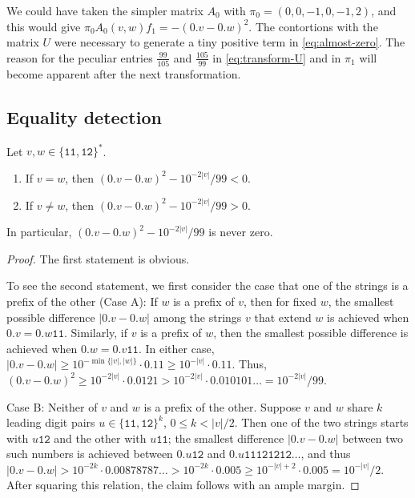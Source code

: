 \documentclass[a4paper,cleveref, autoref, thm-restate]{lipics-v2021}
\begin{document}
We could have taken the simpler matrix $A_0$ 
with $\pi_0=(0,0,-1,0,-1,2)$, and this would give
$\pi_0 A_0(v,w) f_1 = - (0.v-0.w)^2$. The contortions with the matrix
$U$
were necessary to generate a tiny positive term in \eqref{eq:almost-zero}.
The reason for the peculiar entries $\frac{99}{105}$ and $\frac{105}{99}$
in \eqref{eq:transform-U} and in $\pi_1$
will become
apparent after the next transformation.

\subsection{Equality detection}
\label{sec:equality}



\begin{lemma} \label{lemma:modif-threshold}
  Let $v,w \in \{\mathtt{11},\mathtt{12}\}^*$.
  \begin{enumerate}
  \item       If $v=w$,
    then
    $(0.v-0.w)^2-10^{-2|v|}/99 < 0$.
  \item       If $v\ne w$,
    then
    $(0.v-0.w)^2-10^{-2|v|}/99 > 0$.
  \end{enumerate}
 In particular, $(0.v-0.w)^2-10^{-2|v|}/99$ is never zero.
\end{lemma}
\begin{proof}
  The first statement is obvious.

To see the second statement,
we first consider the case that one of the strings
is a  prefix of
the other %
(Case A):
If $w$ is a prefix of $v$, then for
fixed $w$,
  the smallest possible difference
$|0.v-0.w|$ among the strings $v$ that extend $w$
is achieved %
%
when
$0.v=0.w\mathtt{11}$.
Similarly,
if $v$ is a prefix of $w$, then
  the smallest possible difference
is achieved %
when
$0.w=0.v\mathtt{11}$.
%
In either case,
$|0.v-0.w| \ge 10^{-\min\{|v|,|w|\}}\cdot 0.11
\ge
10^{-|v|} \cdot 0.11
$.
Thus,
$(0.v-0.w) ^2
\ge
10^{-2|v|} \cdot 0.0121
>10^{-2|v|} \cdot 0.010101\ldots
=10^{-2|v|}/99
$.


Case B: Neither of $v$ and $w$  is a prefix of the other.
  Suppose
  $v$ and $w$
share $k$ leading digit pairs  $u\in \{\mathtt{11},\mathtt{12}\}^k$,
$0\le k<  |v|/2$.
Then one of the two strings
 starts with
$u\mathtt{12}$ and the other with %
$u\mathtt{11}$;
the smallest difference
$|0.v-0.w|$
between
two such numbers
is achieved between %
$0.u\mathtt{12}$ and
$0.u\mathtt{11121212\ldots}$, %
and thus
$|0.v-0.w| > 10^{-2k}\cdot 0.00878787\ldots
> 10^{-2k}\cdot 0.005\ge
10^{-|v|+2}\cdot 0.005=
10^{-|v|}/2$.
After squaring this relation,
the claim follows with an ample margin.
\end{proof}
\end{document}
